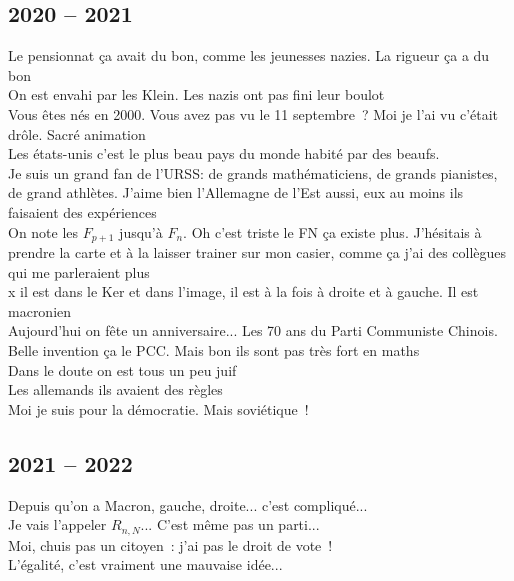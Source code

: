 \documentclass[french, a4paper, openany]{book}
\begin{document}
	\subsection*{2020 -- 2021}

	\noindent \og Le pensionnat ça avait du bon, comme les jeunesses nazies. La rigueur ça a du bon \fg \\
	\og On est envahi par les Klein. Les nazis ont pas fini leur boulot \fg \\
	\og Vous êtes nés en 2000. Vous avez pas vu le 11 septembre~? Moi je l'ai vu c'était drôle. Sacré animation \fg \\
	\og Les états-unis c'est le plus beau pays du monde habité par des beaufs. \fg \\
	\og Je suis un grand fan de l'URSS: de grands mathématiciens, de grands pianistes, de grand athlètes. J'aime bien l'Allemagne de l'Est aussi, eux au moins ils faisaient des expériences \fg \\
	\og On note les $F_{p+1}$ jusqu'à $F_n$. Oh c'est triste le FN ça existe plus. J'hésitais à prendre la carte et à la laisser trainer sur mon casier, comme ça j'ai des collègues qui me parleraient plus \fg \\
	\og x il est dans le Ker et dans l'image, il est à la fois à droite et à gauche. Il est macronien \fg \\
	\og Aujourd'hui on fête un anniversaire... Les 70 ans du Parti Communiste Chinois. Belle invention ça le PCC. Mais bon ils sont pas très fort en maths \fg \\
	\og Dans le doute on est tous un peu juif \fg \\
	\og Les allemands ils avaient des règles \fg \\
	\og Moi je suis pour la démocratie. Mais soviétique~! \fg \\

	\subsection*{2021 -- 2022}
	
	\og Depuis qu'on a Macron, gauche, droite... c'est compliqué... \fg \\
	\og Je vais l'appeler $R_{n,N}$... C'est même pas un parti... \fg \\
	\og Moi, chuis pas un citoyen~: j'ai pas le droit de vote~! \fg \\
	\og L'égalité, c'est vraiment une mauvaise idée... \fg \\
\end{document}
